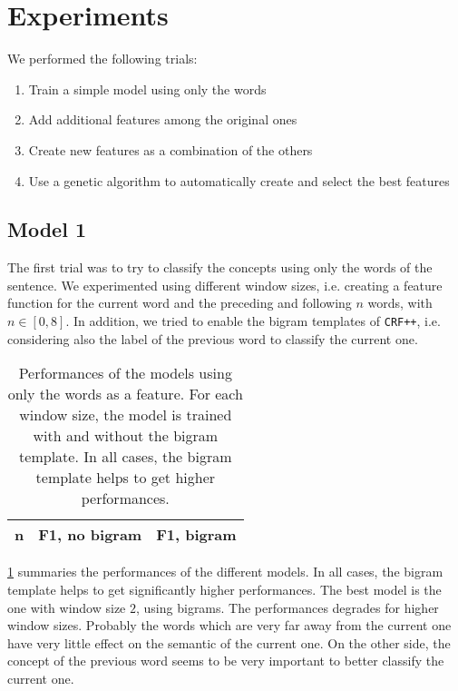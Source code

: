 \section{Experiments}
\label{sec:experiments}

We performed the following trials:
\begin{enumerate}
    \item Train a simple model using only the words
    \item Add additional features among the original ones
    \item Create new features as a combination of the others
    \item Use a genetic algorithm to automatically create and select the best features
\end{enumerate}

\subsection{Model 1}
\label{subsection:1}
The first trial was to try to classify the concepts using only the words of the sentence.
We experimented using different window sizes, i.e. creating a feature function for the current word and the preceding and following $n$ words, with $n \in [0,8]$.
In addition, we tried to enable the bigram templates of \texttt{CRF++}, i.e. considering also the label of the previous word to classify the current one. 

\begin{table}[t!]
	\centering
    \begin{tabular}{ c c c }
    	\toprule
    		\multicolumn{1}{c}{n} & \multicolumn{1}{c}{F1, no bigram} & \multicolumn{1}{c}{F1, bigram} \\
    	\midrule
            
    	\bottomrule
	\end{tabular}
    \caption{Performances of the models using only the words as a feature. For each window size, the model is trained with and without the bigram template. In all cases, the bigram template helps to get higher performances.}
	\label{tab:words}
\end{table}

\cref{tab:words} summaries the performances of the different models.
In all cases, the bigram template helps to get significantly higher performances.
The best model is the one with window size $2$, using bigrams.
The performances degrades for higher window sizes.
Probably the words which are very far away from the current one have very little effect on the semantic of the current one.
On the other side, the concept of the previous word seems to be very important to better classify the current one.
